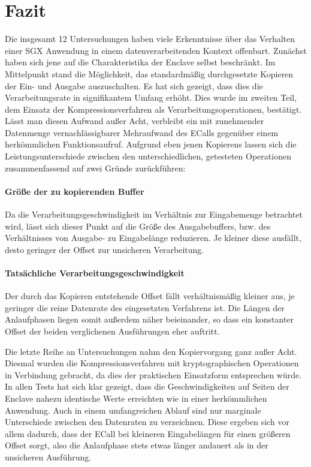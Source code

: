 \section{Fazit}

Die insgesamt 12 Untersuchungen haben viele Erkenntnisse über das Verhalten einer \ac{SGX} Anwendung in einem datenverarbeitenden Kontext offenbart. Zunächst haben sich jene auf die Charakteristika der Enclave selbst beschränkt. Im Mittelpunkt stand die Möglichkeit, das standardmäßig durchgesetzte Kopieren der Ein- und Ausgabe auszuschalten. Es hat sich gezeigt, dass dies die Verarbeitungsrate in signifikantem Umfang erhöht. Dies wurde im zweiten Teil, dem Einsatz der Kompressionsverfahren als Verarbeitungsoperationen, bestätigt. Lässt man diesen Aufwand außer Acht, verbleibt ein mit zunehmender Datenmenge vernachlässigbarer Mehraufwand des \acp{ECall} gegenüber einem herkömmlichen Funktionsaufruf. Aufgrund eben jenen Kopierens lassen sich die Leistungsunterschiede zwischen den unterschiedlichen, getesteten Operationen zusammenfassend auf zwei Gründe zurückführen:

\paragraph{Größe der zu kopierenden Buffer}
Da die Verarbeitungsgeschwindigkeit im Verhältnis zur Eingabemenge betrachtet wird, lässt sich dieser Punkt auf die Größe des Ausgabebuffers, bzw. des Verhältnisses von Ausgabe- zu Eingabelänge reduzieren. Je kleiner diese ausfällt, desto geringer der Offset zur unsicheren Verarbeitung.

\paragraph{Tatsächliche Verarbeitungsgeschwindigkeit}
Der durch das Kopieren entstehende Offset fällt verhältnismäßig kleiner aus, je geringer die reine Datenrate des eingesetzten Verfahrens ist. Die Längen der Anlaufphasen liegen somit außerdem näher beieinander, so dass ein konstanter Offset der beiden verglichenen Ausführungen eher auftritt.

Die letzte Reihe an Untersuchungen nahm den Kopiervorgang ganz außer Acht. Diesmal wurden die Kompressionsverfahren mit kryptographischen Operationen in Verbindung gebracht, da dies der praktischen Einsatzform entsprechen würde. In allen Tests hat sich klar gezeigt, dass die Geschwindigkeiten auf Seiten der Enclave nahezu identische Werte erreichten wie in einer herkömmlichen Anwendung. Auch in einem umfangreichen Ablauf sind nur marginale Unterschiede zwischen den Datenraten zu verzeichnen. Diese ergeben sich vor allem dadurch, dass der \ac{ECall} bei kleineren Eingabelängen für einen größeren Offset sorgt, also die Anlaufphase stets etwas länger andauert als in der unsicheren Ausführung.

